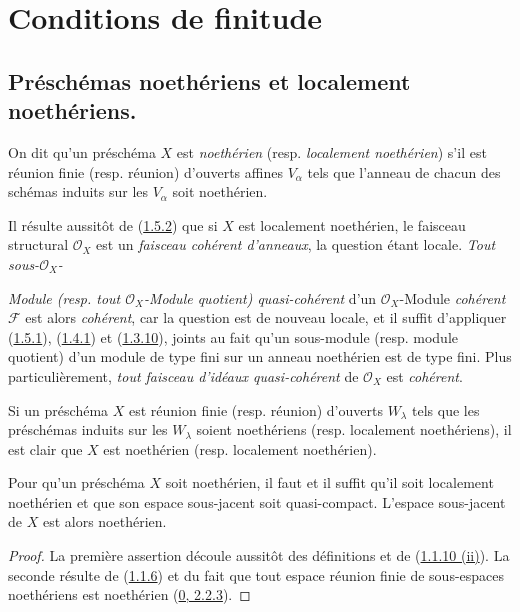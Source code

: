 \section{Conditions de finitude}
\label{section:I.6-fr}

\subsection{Préschémas noethériens et localement noethériens.}
\label{subsection:I.6.1-fr}

\begin{definition}[6.1.1]
\label{I.6.1.1-fr}
On dit qu'un préschéma $X$ est \emph{noethérien} (resp. \emph{localement
noethérien}) s'il est réunion finie (resp. réunion) d'ouverts affines
$V_\alpha$ tels que l'anneau de chacun des schémas induits sur les $V_\alpha$
soit noethérien.
\end{definition}

Il résulte aussitôt de (\hyperref[I.1.5.2-fr]{1.5.2}) que si $X$ est
localement noethérien, le faisceau structural $\mathscr{O}_X$ est un
\emph{faisceau cohérent d'anneaux}, la question étant locale. \emph{Tout
sous-$\mathscr{O}_X$-}

\emph{Module (resp. tout $\mathscr{O}_X$-Module quotient) quasi-cohérent}
d'un $\mathscr{O}_X$-Module \emph{cohérent} $\mathscr{F}$ est alors
\emph{cohérent}, car la question est de nouveau locale, et il suffit
d'appliquer (\hyperref[I.1.5.1-fr]{1.5.1}),
(\hyperref[I.1.4.1-fr]{1.4.1}) et
(\hyperref[I.1.3.10-fr]{1.3.10}), joints au fait qu'un sous-module (resp.
module quotient) d'un module de type fini sur un anneau noethérien est de
type fini. Plus particulièrement, \emph{tout faisceau d'idéaux
quasi-cohérent} de $\mathscr{O}_X$ est \emph{cohérent}.

Si un préschéma $X$ est réunion finie (resp. réunion) d'ouverts $W_\lambda$
tels que les préschémas induits sur les $W_\lambda$ soient noethériens (resp.
localement noethériens), il est clair que $X$ est noethérien (resp.
localement noethérien).

\begin{proposition}[6.1.2]
\label{I.6.1.2-fr}
Pour qu'un préschéma $X$ soit noethérien, il faut et il suffit qu'il soit
localement noethérien et que son espace sous-jacent soit quasi-compact.
L'espace sous-jacent de $X$ est alors noethérien.
\end{proposition}

\begin{proof}
La première assertion découle aussitôt des définitions et de
(\hyperref[I.1.1.10-fr]{1.1.10 (ii)}). La seconde résulte de
(\hyperref[I.1.1.6-fr]{1.1.6}) et du fait que tout espace réunion finie de
sous-espaces noethériens est noethérien
(\hyperref[0.2.2.3-fr]{0, 2.2.3}).
\end{proof}

